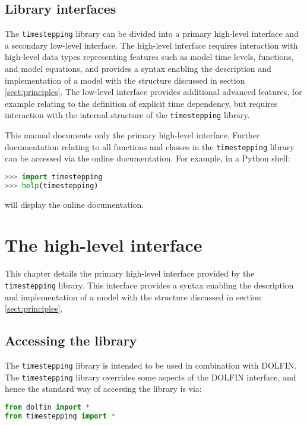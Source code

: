 \documentclass[a4paper]{book}
\begin{document}
\section{Library interfaces}

The \verb+timestepping+ library can be divided into a primary high-level
interface and a secondary low-level interface. The high-level interface requires
interaction with high-level data types representing features such as model time
levels, functions, and model equations, and provides a syntax enabling the
description and implementation of a model with the structure discussed in
section \ref{sect:principles}. The low-level interface provides additional
advanced features, for example relating to the definition of explicit time
dependency, but requires interaction with the internal structure of the
\verb+timestepping+ library.

This manual documents only the primary high-level interface. Further
documentation relating to all functions and classes in the \verb+timestepping+
library can be accessed via the online documentation. For example, in a Python
shell:
\begin{lstlisting}[language = python, frame = single, basicstyle=\footnotesize]
>>> import timestepping
>>> help(timestepping)
\end{lstlisting}
will display the online documentation.

\chapter{The high-level interface}

This chapter details the primary high-level interface provided by the \linebreak
\verb+timestepping+ library. This interface provides a syntax enabling the
description and implementation of a model with the structure discussed in
section \ref{sect:principles}.

\section{Accessing the library}

The \verb+timestepping+ library is intended to be used in combination with
DOLFIN. The \verb+timestepping+ library overrides some aspects of the DOLFIN
interface, and hence the standard way of accessing the library is via:
\begin{lstlisting}[language = python, frame = single, basicstyle=\footnotesize]
from dolfin import *
from timestepping import *
\end{lstlisting}
\end{document}
